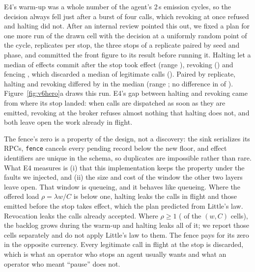  E4's warm-up was a whole number of the agent's 2\,s emission cycles, so
the decision always fell just after a burst of four calls, which revoking at once refused and halting did not. After an
internal review pointed this out, we fixed a plan for one more run of the drawn cell with the decision at a uniformly
random point of the cycle, \vsixPhaseReplicates{} replicates per stop, the three stops of a replicate paired by seed
and phase, and committed the front figure to its result before running it. Halting let a median of
\vsixPhaseHaltMedian{} effects commit after the stop took effect (range \vsixPhaseHaltRange), revoking
\vsixPhaseRevokeMedian{} (\vsixPhaseRevokeRange) and fencing \vsixPhaseFenceRange, which discarded a median of
\vsixPhaseFenceLostMedian{} legitimate calls (\vsixPhaseFenceLostRange). Paired by replicate, halting and revoking
differed by \vsixPhaseDiffMedian{} in the median (range \vsixPhaseDiffRange; no difference in \vsixPhaseDiffZero{} of
\vsixPhaseReplicates). Figure~\ref{fig:v6hero}a draws this run. E4's gap between halting and revoking came from where
its stop landed: when calls are dispatched as soon as they are emitted, revoking at the broker refuses almost nothing
that halting does not, and both leave open the work already in flight.

 The fence's zero is a property of the design, not a discovery: the sink serializes its
RPCs, \texttt{fence} cancels every pending record below the new floor, and effect identifiers are unique in the schema,
so duplicates are impossible rather than rare. What E4 measures is (i) that this implementation keeps the property
under the faults we injected, and (ii) the size and cost of the window the other two layers leave open. That window is
queueing, and it behaves like queueing. Where the offered load \(\rho = \lambda w / C\) is below one, halting leaks
the calls in flight and those emitted before the stop takes effect, which the plan predicted from Little's law.
\vsixLittleSentence{} Revocation leaks the calls already accepted.
Where \(\rho \ge 1\) (\vsixEFourOverloadedCells{} of the \vsixEFourWCCells{} \((w, C)\) cells), the backlog grows during the warm-up and
halting leaks all of it; we report those cells separately and do not apply Little's law to them. The fence pays for its
zero in the opposite currency. Every legitimate call in flight at the stop is discarded, which is what an operator who
stops an agent usually wants and what an operator who meant ``pause'' does not.

